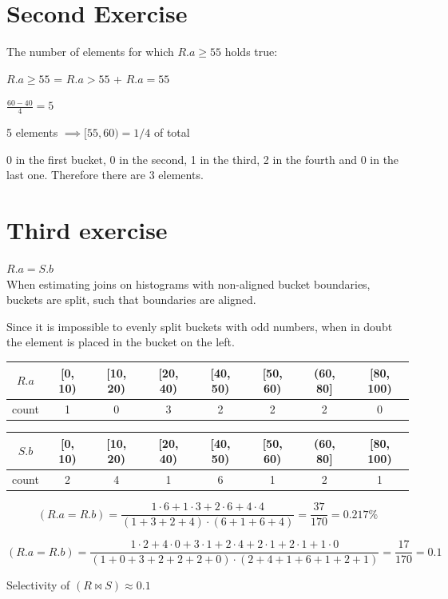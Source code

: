 \documentclass[12pt]{article}
\begin{document}
	\section{Second Exercise}
	
	The number of elements for which $R.a \geq 55$ holds true:
	
	$R.a \geq 55$ = $R.a > 55$ + $R.a = 55$
	
	$\frac{60-40}{4} = 5$
	
	5 elements $\implies [55, 60) = 1/4$ of total
	
	0 in the first bucket, 0 in the second, 1 in the third, 2 in the fourth and 0 in the last one. Therefore there are 3 elements.
	
	\section{Third exercise}
	$R.a = S.b$ \\
	When estimating joins on histograms with non-aligned bucket boundaries, buckets are split, such that boundaries are aligned.
	
	Since it is impossible to evenly split buckets with odd numbers, when in doubt the element is placed in the bucket on the left.
	
	\begin{tabular}{c|c|c|c|c|c|c|c}
	     $R.a$ & [0, 10) & [10, 20) & [20, 40) & [40, 50) & [50, 60) & (60, 80] & [80, 100) \\
	     \hline
	     count & 1 & 0 & 3 & 2 & 2 & 2 & 0 \\
	\end{tabular}
	
	\begin{tabular}{c|c|c|c|c|c|c|c}
		$S.b$ & [0, 10) & [10, 20) & [20, 40) & [40, 50) & [50, 60) & (60, 80] & [80, 100) \\
		\hline
		count & 2 & 4 & 1 & 6 & 1 & 2 & 1 \\
	\end{tabular}
	
	$$(R.a = R.b) = \frac{1 \cdot 6 + 1 \cdot 3 + 2 \cdot 6 + 4 \cdot 4}{(1+3+2+4) \cdot (6+1+6+4)} = \frac{37}{170} = 0.217\%$$
	
	$$(R.a = R.b) = \frac{1 \cdot 2 + 4 \cdot 0 + 3 \cdot 1 + 2 \cdot 4 + 2 \cdot 1 + 2 \cdot 1 + 1 \cdot 0}{(1+0+3+2+2+2+0) \cdot (2+4+1+6+1+2+1)} = \frac{17}{170} = 0.1$$
	
	Selectivity of $(R \Join S) \approx 0.1$
\end{document}

